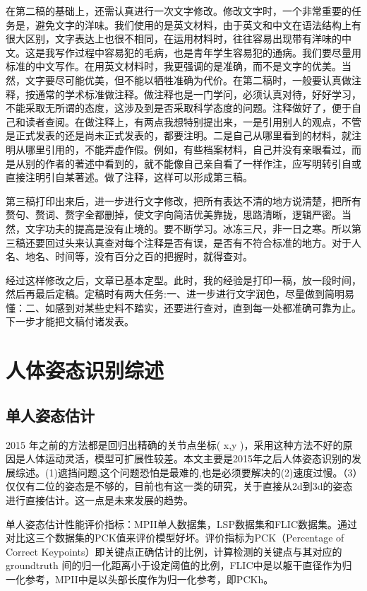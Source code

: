 \documentclass[11pt]{article}
\begin{document}
在第二稿的基础上，还需认真进行一次文字修改。修改文字时，一个非常重要的任务是，避免文字的洋味。我们使用的是英文材料，由于英文和中文在语法结构上有很大区别，文字表达上也很不相同，在运用材料时，往往容易出现带有洋味的中文。这是我写作过程中容易犯的毛病，也是青年学生容易犯的通病。我们要尽量用标准的中文写作。在用英文材料时，我更强调的是准确，而不是文字的优美。当然，文字要尽可能优美，但不能以牺牲准确为代价。在第二稿时，一般要认真做注释，按通常的学术标准做注释。做注释也是一门学问，必须认真对待，好好学习，不能采取无所谓的态度，这涉及到是否采取科学态度的问题。注释做好了，便于自己和读者查阅。在做注释上，有两点我想特别提出来，一是引用别人的观点，不管是正式发表的还是尚未正式发表的，都要注明。二是自己从哪里看到的材料，就注明从哪里引用的，不能弄虚作假。例如，有些档案材料，自己并没有亲眼看过，而是从别的作者的著述中看到的，就不能像自己亲自看了一样作注，应写明转引自或直接注明引自某著述。做了注释，这样可以形成第三稿。

第三稿打印出来后，进一步进行文字修改，把所有表达不清的地方说清楚，把所有赘句、赘词、赘字全都删掉，使文字向简洁优美靠拢，思路清晰，逻辑严密。当然，文字功夫的提高是没有止境的。要不断学习。冰冻三尺，非一日之寒。所以第三稿还要回过头来认真查对每个注释是否有误，是否有不符合标准的地方。对于人名、地名、时间等，没有百分之百的把握时，就得查对。

经过这样修改之后，文章已基本定型。此时，我的经验是打印一稿，放一段时间，然后再最后定稿。定稿时有两大任务:一、进一步进行文字润色，尽量做到简明易懂：二、如感到对某些史料不踏实，还要进行查对，直到每一处都准确可靠为止。下一步才能把文稿付诸发表。
\section{人体姿态识别综述}
\subsection{单人姿态估计}
2015 年之前的方法都是回归出精确的关节点坐标( x,y )，采用这种方法不好的原因是人体运动灵活，模型可扩展性较差。本文主要是2015年之后人体姿态识别的发展综述。(1)遮挡问题,这个问题恐怕是最难的,也是必须要解决的(2)速度过慢。（3）仅仅有二位的姿态是不够的，目前也有这一类的研究，关于直接从2d到3d的姿态进行直接估计。这一点是未来发展的趋势。

单人姿态估计性能评价指标：MPII单人数据集，LSP数据集和FLIC数据集。通过对比这三个数据集的PCK值来评价模型好坏。评价指标为PCK（Percentage of Correct Keypoints）即关键点正确估计的比例，计算检测的关键点与其对应的groundtruth 间的归一化距离小于设定阈值的比例，FLIC中是以躯干直径作为归一化参考，MPII中是以头部长度作为归一化参考，即PCKh。
\end{document}
